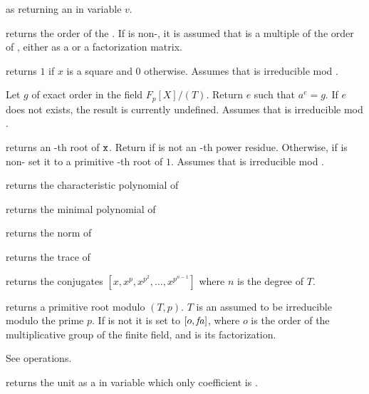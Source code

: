  as
 returning an  in variable $v$.

returns the order of the  .
If  is non-, it is assumed that  is a multiple of the
order of , either as a  or a factorization matrix.

 returns $1$ if $x$ is a square
and $0$ otherwise. Assumes that  is irreducible mod .

 Let $g$ of exact
order  in the field $F_p[X]/(T)$. Return $e$ such that $a^e=g$. If
$e$ does not exists, the result is currently undefined. Assumes that 
is irreducible mod .

 returns an
-th root of ${\tt x}$.  Return  if  is not an
-th power residue. Otherwise, if  is non- set it to
a primitive -th root of $1$. Assumes that  is irreducible mod
.

 returns the characteristic
polynomial of 

 returns the minimal polynomial
of 

 returns the norm of 

 returns the trace of 

 returns the conjugates
$[x,x^p,x^{p^2},\ldots,x^{p^{n-1}}]$ where $n$ is the degree of $T$.

 returns a primitive root modulo
$(T,p)$. $T$ is an  assumed to be irreducible modulo the prime
$p$. If  is not  it is set to $[o,\hbox{\it fa\/}]$, where $o$ is the
order of the multiplicative group of the finite field, and  is
its factorization.

 See  operations.

 returns the unit  as a
 in variable  which only coefficient is .

